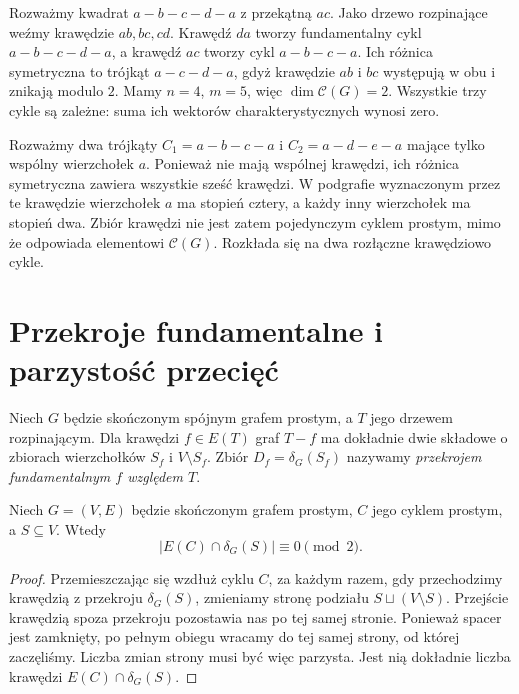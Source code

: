\begin{przyklad}
Rozważmy kwadrat $a-b-c-d-a$ z przekątną $ac$.
Jako drzewo rozpinające weźmy krawędzie
$ab,bc,cd$. Krawędź $da$ tworzy fundamentalny
cykl $a-b-c-d-a$, a krawędź $ac$ tworzy
cykl $a-b-c-a$. Ich różnica symetryczna to
trójkąt $a-c-d-a$, gdyż krawędzie $ab$ i $bc$
występują w obu i znikają modulo $2$.
Mamy $n=4$, $m=5$, więc $\dim\mathcal C(G)=2$.
Wszystkie trzy cykle są zależne: suma ich
wektorów charakterystycznych wynosi zero.
\end{przyklad}

\begin{przyklad}
Rozważmy dwa trójkąty $C_1=a-b-c-a$ i $C_2=a-d-e-a$
mające tylko wspólny wierzchołek $a$.
Ponieważ nie mają wspólnej krawędzi, ich różnica
symetryczna zawiera wszystkie sześć krawędzi.
W podgrafie wyznaczonym przez te krawędzie
wierzchołek $a$ ma stopień cztery, a każdy inny
wierzchołek ma stopień dwa. Zbiór krawędzi nie
jest zatem pojedynczym cyklem prostym, mimo że
odpowiada elementowi $\mathcal C(G)$.
Rozkłada się na dwa rozłączne krawędziowo cykle.
\end{przyklad}

\section{Przekroje fundamentalne i parzystość przecięć}
\label{sec:tg-przekroje-fundamentalne}

\begin{definicja}
Niech $G$ będzie skończonym spójnym grafem
prostym, a $T$ jego drzewem rozpinającym.
Dla krawędzi $f\in E(T)$ graf $T-f$
ma dokładnie dwie składowe o zbiorach
wierzchołków $S_f$ i $V\setminus S_f$.
Zbiór $D_f=\delta_G(S_f)$ nazywamy
\emph{przekrojem fundamentalnym $f$
względem $T$}.
\end{definicja}

\begin{stwierdzenie}
Niech $G=(V,E)$ będzie skończonym grafem prostym,
$C$ jego cyklem prostym, a $S\subseteq V$.
Wtedy
\[
|E(C)\cap\delta_G(S)|\equiv0\pmod2.
\]
\end{stwierdzenie}

\begin{proof}
Przemieszczając się wzdłuż cyklu $C$, za
każdym razem, gdy przechodzimy krawędzią
z przekroju $\delta_G(S)$, zmieniamy
stronę podziału $S\sqcup(V\setminus S)$.
Przejście krawędzią spoza przekroju pozostawia
nas po tej samej stronie. Ponieważ spacer
jest zamknięty, po pełnym obiegu wracamy
do tej samej strony, od której zaczęliśmy.
Liczba zmian strony musi być więc parzysta.
Jest nią dokładnie liczba krawędzi
$E(C)\cap\delta_G(S)$.
\end{proof}


